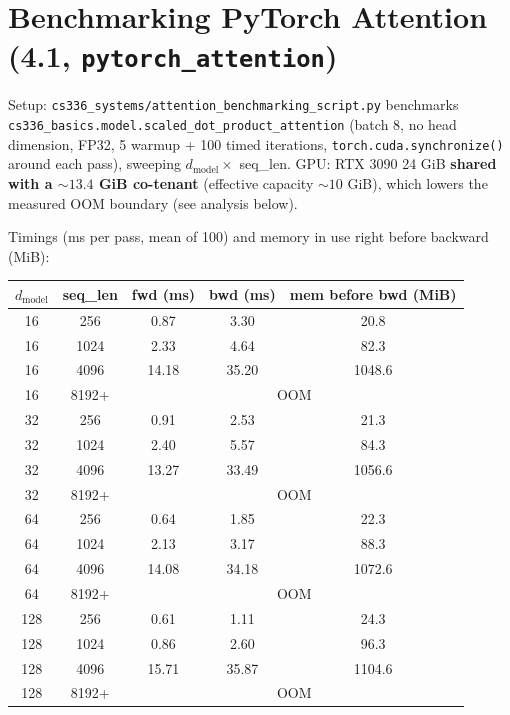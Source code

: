 \documentclass[11pt]{article}
\newcommand{\code}[1]{\texttt{#1}}
\begin{document}
\section{Benchmarking PyTorch Attention (4.1, \texttt{pytorch\_attention})}

Setup: \code{cs336\_systems/attention\_benchmarking\_script.py} benchmarks
\code{cs336\_basics.model.scaled\_dot\_product\_attention} (batch 8, no head dimension, FP32, 5
warmup + 100 timed iterations, \code{torch.cuda.synchronize()} around each pass), sweeping
$d_{\text{model}} \times$ seq\_len. GPU: RTX 3090 24 GiB \textbf{shared with a ${\sim}13.4$ GiB
co-tenant} (effective capacity ${\sim}10$ GiB), which lowers the measured OOM boundary (see analysis
below).

Timings (ms per pass, mean of 100) and memory in use right before backward (MiB):

\begin{center}\small
\begin{tabular}{ccccc}
\toprule
$d_{\text{model}}$ & seq\_len & fwd (ms) & bwd (ms) & mem before bwd (MiB) \\
\midrule
16  & 256   & 0.87  & 3.30  & 20.8 \\
16  & 1024  & 2.33  & 4.64  & 82.3 \\
16  & 4096  & 14.18 & 35.20 & 1048.6 \\
16  & 8192+ & \multicolumn{3}{c}{OOM} \\
\midrule
32  & 256   & 0.91  & 2.53  & 21.3 \\
32  & 1024  & 2.40  & 5.57  & 84.3 \\
32  & 4096  & 13.27 & 33.49 & 1056.6 \\
32  & 8192+ & \multicolumn{3}{c}{OOM} \\
\midrule
64  & 256   & 0.64  & 1.85  & 22.3 \\
64  & 1024  & 2.13  & 3.17  & 88.3 \\
64  & 4096  & 14.08 & 34.18 & 1072.6 \\
64  & 8192+ & \multicolumn{3}{c}{OOM} \\
\midrule
128 & 256   & 0.61  & 1.11  & 24.3 \\
128 & 1024  & 0.86  & 2.60  & 96.3 \\
128 & 4096  & 15.71 & 35.87 & 1104.6 \\
128 & 8192+ & \multicolumn{3}{c}{OOM} \\
\bottomrule
\end{tabular}
\end{center}
\end{document}
